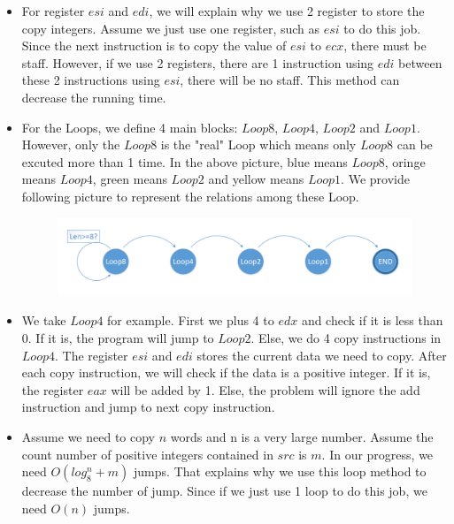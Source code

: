 \documentclass[12pt,a4paper]{article}
\theoremstyle{definition}
\numberwithin{equation}{section}
\numberwithin{figure}{section}
\begin{document}
\begin{itemize}
	\item For register $esi$ and $edi$, we will explain why we use 2 register to store the copy integers. Assume we just use one register, such as $esi$ to do this job. Since the next instruction is to copy the value of $esi$ to $ecx$, there must be staff. However, if we use 2 registers, there are 1 instruction using $edi$ between these 2 instructions using $esi$, there will be no staff. This method can decrease the running time.
	\item For the Loops, we define 4 main blocks: $Loop8$, $Loop4$, $Loop2$ and $Loop1$. However, only the $Loop8$ is the "real" Loop which means only $Loop8$ can be excuted more than 1 time. In the above picture, blue means $Loop8$, oringe means $Loop4$, green means $Loop2$ and yellow means $Loop1$. We provide following picture to represent the relations among these Loop.
	\begin{figure}[H]
		\centering
		\includegraphics[width=12cm]{Spot.pdf}
	\end{figure}
	\item We take $Loop4$ for example. First we plus 4 to $edx$ and check if it is less than 0. If it is, the program will jump to $Loop2$. Else, we do 4 copy instructions in $Loop4$. The register $esi$ and $edi$ stores the current data we need to copy. After each copy instruction, we will check if the data is a positive integer. If it is, the register $eax$ will be added by 1. Else, the problem will ignore the add instruction and jump to next copy instruction.
	\item Assume we need to copy $n$ words and n is a very large number. Assume the count number of positive integers contained in $src$ is $m$. In our progress, we need $O(log_{8}^n+m)$ jumps. That explains why we use this loop method to decrease the number of jump. Since if we just use 1 loop to do this job, we need $O(n)$ jumps.
\end{itemize}
\end{document}
